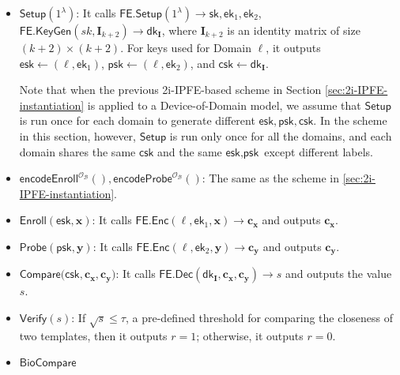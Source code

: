 \begin{itemize}

	\item $\textsf{Setup}(1^\lambda)$: It calls $\textsf{FE.Setup}(1^\lambda) \to \textsf{sk}, \textsf{ek}_1, \textsf{ek}_2$, $\textsf{FE.KeyGen}(sk, \mathbf{I}_{k+2}) \to \textsf{dk}_{\mathbf{I}} $, where $\mathbf{I}_{k+2}$ is an identity matrix of size $(k+2) \times (k+2)$. For keys used for \textsf{Domain} $\ell$, it outputs $\textsf{esk} \gets (\ell, \textsf{ek}_1)$, $\textsf{psk} \gets (\ell, \textsf{ek}_2)$, and $\textsf{csk} \gets \textsf{dk}_{\mathbf{I}}$.

	Note that when the previous 2i-IPFE-based scheme in Section \ref{sec:2i-IPFE-instantiation} is applied to a Device-of-Domain model, we assume that $\textsf{Setup}$ is run once for each domain to generate different $\textsf{esk}, \textsf{psk}, \textsf{csk}$. In the scheme in this section, however, $\textsf{Setup}$ is run only once for all the domains, and each domain shares the same $\textsf{csk}$ and the same $\textsf{esk}, \textsf{psk}$ except different labels.

	\item $\textsf{encodeEnroll}^{\mathcal{O}_{\mathcal{B}}}(), \textsf{encodeProbe}^{\mathcal{O}_{\mathcal{B}}}()$: The same as the scheme in \ref{sec:2i-IPFE-instantiation}. 

	\item $\textsf{Enroll}(\textsf{esk}, \mathbf{x})$: It calls $\textsf{FE.Enc}(\ell, \textsf{ek}_1, \mathbf{x}) \to \mathbf{c_x}$ and outputs $\mathbf{c_x}$.

	\item $\textsf{Probe}(\textsf{psk}, \mathbf{y})$: It calls $\textsf{FE.Enc}(\ell, \textsf{ek}_2, \mathbf{y}) \to \mathbf{c_y}$ and outputs $\mathbf{c_y}$.

	\item $\textsf{Compare}(\textsf{csk}, \mathbf{c_x}, \mathbf{c_y)}$: It calls $\textsf{FE.Dec}(\textsf{dk}_{\mathbf{I}}, \mathbf{c_x}, \mathbf{c_y}) \to s$ and outputs the value $s$.

	\item $\textsf{Verify}(s)$: If $\sqrt{s} \leq \tau$, a pre-defined threshold for comparing the closeness of two templates, then it outputs $r = 1$; otherwise, it outputs $r = 0$.

	\item $\textsf{BioCompare}$

\end{itemize}

